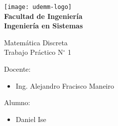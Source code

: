 \begin{titlepage}
	\begin{center}
		\vspace*{0.5cm}
		\texttt{[image: udemm-logo]}\\
		\vspace{0.2cm}
		\Large
		\textbf{Facultad de Ingeniería}\\
		\textbf{Ingeniería en Sistemas}\\
		\vspace{2cm}

		\Huge
		Matemática Discreta\\
		Trabajo Práctico N$^{\circ}$ 1
		\vfill

		\raggedright
		\Large
		Docente:
		\begin{itemize}
			\item[] Ing. Alejandro Fracisco Maneiro\\
		\end{itemize}
		Alumno:
		\begin{itemize}
			\item[] Daniel Ise
		\end{itemize}
		\vspace{1cm}

	\end{center}
\end{titlepage}
